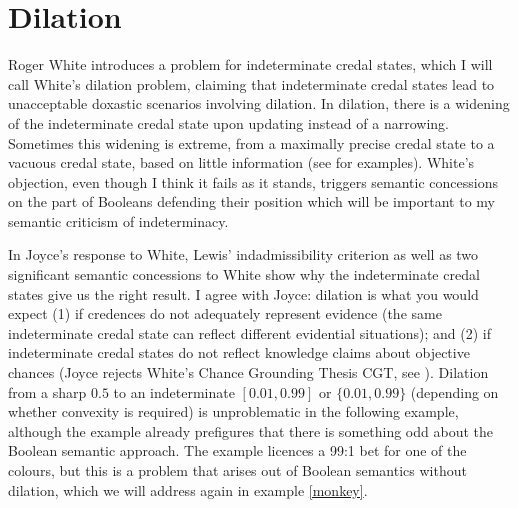 \documentclass[11pt]{article}
\begin{document}
\section{Dilation} 
\label{Dilation}

Roger White introduces a problem for indeterminate credal states,
which I will call White's dilation problem, claiming that
indeterminate credal states lead to unacceptable doxastic scenarios
involving dilation. In dilation, there is a widening of the
indeterminate credal state upon updating instead of a narrowing.
Sometimes this widening is extreme, from a maximally precise credal
state to a vacuous credal state, based on little information (see
 for examples). White's objection, even though I
think it fails as it stands, triggers semantic concessions on the part
of Booleans defending their position which will be important to my
semantic criticism of indeterminacy.

In Joyce's response to White, Lewis' indadmissibility criterion as
well as two significant semantic concessions to White show why the
indeterminate credal states give us the right result. I agree with
Joyce: dilation is what you would expect (1) if credences do not
adequately represent evidence (the same indeterminate credal state can
reflect different evidential situations); and (2) if indeterminate
credal states do not reflect knowledge claims about objective chances
(Joyce rejects White's Chance Grounding Thesis CGT, see
). Dilation from a sharp $0.5$ to an
indeterminate $[0.01,0.99]$ or $\{0.01,0.99\}$ (depending on whether
convexity is required) is unproblematic in the following example,
although the example already prefigures that there is something odd
about the Boolean semantic approach. The example licences a 99:1 bet
for one of the colours, but this is a problem that arises out of
Boolean semantics without dilation, which we will address again in
example \ref{monkey}.

\addtocounter{expls}{1}

\end{document}
